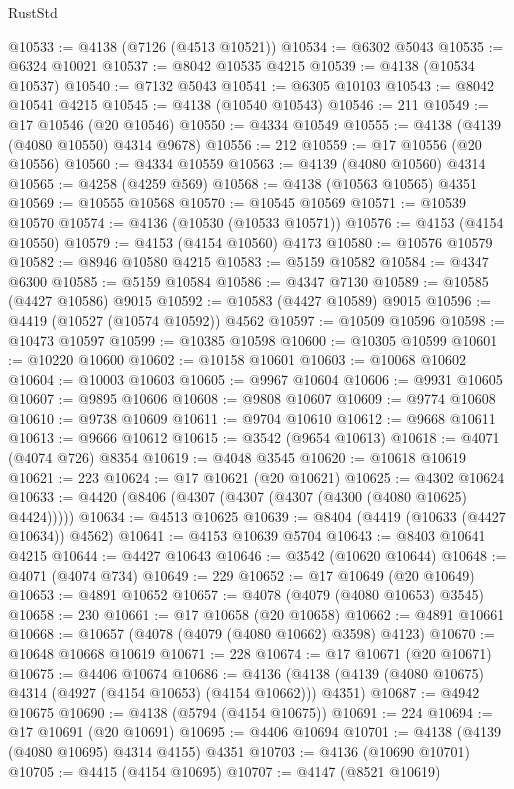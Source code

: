 \begin{lexlean}{RustStd}
\begin{coremodule}
@10533 := @4138 (@7126 (@4513 @10521))
@10534 := @6302 @5043
@10535 := @6324 @10021
@10537 := @8042 @10535 @4215
@10539 := @4138 (@10534 @10537)
@10540 := @7132 @5043
@10541 := @6305 @10103
@10543 := @8042 @10541 @4215
@10545 := @4138 (@10540 @10543)
@10546 := 211
@10549 := @17 @10546 (@20 @10546)
@10550 := @4334 @10549
@10555 := @4138 (@4139 (@4080 @10550) @4314 @9678)
@10556 := 212
@10559 := @17 @10556 (@20 @10556)
@10560 := @4334 @10559
@10563 := @4139 (@4080 @10560) @4314
@10565 := @4258 (@4259 @569)
@10568 := @4138 (@10563 @10565) @4351
@10569 := @10555 @10568
@10570 := @10545 @10569
@10571 := @10539 @10570
@10574 := @4136 (@10530 (@10533 @10571))
@10576 := @4153 (@4154 @10550)
@10579 := @4153 (@4154 @10560) @4173
@10580 := @10576 @10579
@10582 := @8946 @10580 @4215
@10583 := @5159 @10582
@10584 := @4347 @6300
@10585 := @5159 @10584
@10586 := @4347 @7130
@10589 := @10585 (@4427 @10586) @9015
@10592 := @10583 (@4427 @10589) @9015
@10596 := @4419 (@10527 (@10574 @10592)) @4562
@10597 := @10509 @10596
@10598 := @10473 @10597
@10599 := @10385 @10598
@10600 := @10305 @10599
@10601 := @10220 @10600
@10602 := @10158 @10601
@10603 := @10068 @10602
@10604 := @10003 @10603
@10605 := @9967 @10604
@10606 := @9931 @10605
@10607 := @9895 @10606
@10608 := @9808 @10607
@10609 := @9774 @10608
@10610 := @9738 @10609
@10611 := @9704 @10610
@10612 := @9668 @10611
@10613 := @9666 @10612
@10615 := @3542 (@9654 @10613)
@10618 := @4071 (@4074 @726) @8354
@10619 := @4048 @3545
@10620 := @10618 @10619
@10621 := 223
@10624 := @17 @10621 (@20 @10621)
@10625 := @4302 @10624
@10633 := @4420 (@8406 (@4307 (@4307 (@4307 (@4300 (@4080 @10625) @4424)))))
@10634 := @4513 @10625
@10639 := @8404 (@4419 (@10633 (@4427 @10634)) @4562)
@10641 := @4153 @10639 @5704
@10643 := @8403 @10641 @4215
@10644 := @4427 @10643
@10646 := @3542 (@10620 @10644)
@10648 := @4071 (@4074 @734)
@10649 := 229
@10652 := @17 @10649 (@20 @10649)
@10653 := @4891 @10652
@10657 := @4078 (@4079 (@4080 @10653) @3545)
@10658 := 230
@10661 := @17 @10658 (@20 @10658)
@10662 := @4891 @10661
@10668 := @10657 (@4078 (@4079 (@4080 @10662) @3598) @4123)
@10670 := @10648 @10668 @10619
@10671 := 228
@10674 := @17 @10671 (@20 @10671)
@10675 := @4406 @10674
@10686 := @4136 (@4138 (@4139 (@4080 @10675) @4314 (@4927 (@4154 @10653) (@4154 @10662))) @4351)
@10687 := @4942 @10675
@10690 := @4138 (@5794 (@4154 @10675))
@10691 := 224
@10694 := @17 @10691 (@20 @10691)
@10695 := @4406 @10694
@10701 := @4138 (@4139 (@4080 @10695) @4314 @4155) @4351
@10703 := @4136 (@10690 @10701)
@10705 := @4415 (@4154 @10695)
@10707 := @4147 (@8521 @10619)

\end{coremodule}
\end{lexlean}
